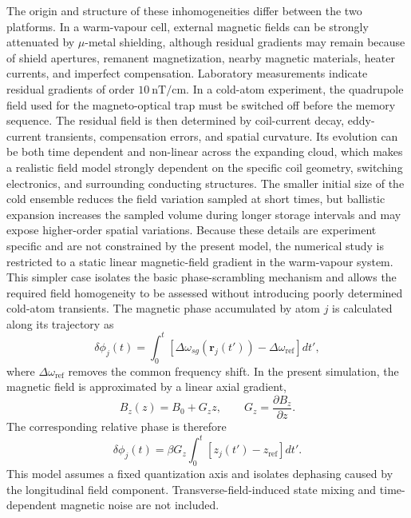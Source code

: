 The origin and structure of these inhomogeneities differ between the two platforms. In a warm-vapour cell, external magnetic fields can be strongly attenuated by $\mu$-metal shielding, although residual gradients may remain because of shield apertures, remanent magnetization, nearby magnetic materials, heater currents, and imperfect compensation. Laboratory measurements indicate residual gradients of order $\SI{10}{\nano\tesla\per\centi\metre}$. In a cold-atom experiment, the quadrupole field used for the magneto-optical trap must be switched off before the memory sequence. The residual field is then determined by coil-current decay, eddy-current transients, compensation errors, and spatial curvature. Its evolution can be both time dependent and non-linear across the expanding cloud, which makes a realistic field model strongly dependent on the specific coil geometry, switching electronics, and surrounding conducting structures. The smaller initial size of the cold ensemble reduces the field variation sampled at short times, but ballistic expansion increases the sampled volume during longer storage intervals and may expose higher-order spatial variations. Because these details are experiment specific and are not constrained by the present model, the numerical study is restricted to a static linear magnetic-field gradient in the warm-vapour system. This simpler case isolates the basic phase-scrambling mechanism and allows the required field homogeneity to be assessed without introducing poorly determined cold-atom transients.
The magnetic phase accumulated by atom $j$ is calculated along its trajectory as
\begin{equation}
\delta\phi_j(t)
=
\int_0^t
\left[
\Delta\omega_{sg}
\left(
\mathbf r_j(t')
\right)
-
\Delta\omega_{\mathrm{ref}}
\right]
dt',
\label{eq:results_magnetic_phase}
\end{equation}
where $\Delta\omega_{\mathrm{ref}}$ removes the common frequency shift. In the present simulation, the magnetic field is approximated by a linear axial gradient,
\begin{equation}
B_z(z)
=
B_0+G_z z,
\qquad
G_z
=
\frac{\partial B_z}{\partial z}.
\label{eq:results_linear_magnetic_gradient}
\end{equation}
The corresponding relative phase is therefore
\begin{equation}
\delta\phi_j(t)
=
\beta G_z
\int_0^t
\left[
z_j(t')-z_{\mathrm{ref}}
\right]
dt'.
\label{eq:results_linear_gradient_phase}
\end{equation}
This model assumes a fixed quantization axis and isolates dephasing caused by the longitudinal field component. Transverse-field-induced state mixing and time-dependent magnetic noise are not included.
